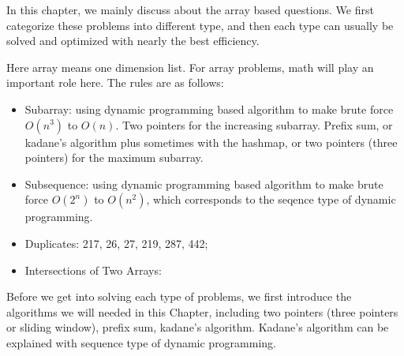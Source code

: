 \documentclass[../specific-algorithms.tex]{subfiles}
\begin{document}
In this chapter, we mainly discuss about the array based questions. We first categorize these problems into different type, and then each type can usually be solved and optimized with nearly the best efficiency. 

Here array means one dimension list. For array problems, math will play an important role here. The rules are as follows:
\begin{itemize}
    \item Subarray: using dynamic programming based algorithm to make brute force $O(n^3)$ to $O(n)$. Two pointers for the increasing subarray. Prefix sum, or kadane's algorithm plus sometimes with the hashmap, or two pointers (three pointers) for the maximum subarray. 
    \item Subsequence: using dynamic programming based algorithm to make brute force $O(2^n)$ to $O(n^2)$, which corresponds to the seqence type of dynamic programming. 
    \item Duplicates: 217, 26, 27, 219, 287, 442;
    \item Intersections of Two Arrays: 
\end{itemize}

Before we get into solving each type of problems, we first introduce the algorithms we will needed in this Chapter, including two pointers (three pointers or sliding window), prefix sum, kadane's algorithm. Kadane's algorithm can be explained with sequence type of dynamic programming. 

    
\end{document}
